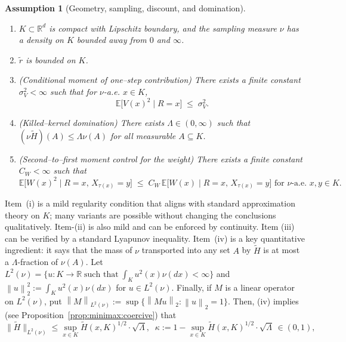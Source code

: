 \documentclass[pdflatex,sn-mathphys-ay]{sn-jnl}%
\numberwithin{equation}{section}
\newcommand\norm[1]{\left\lVert#1\right\rVert}
\newcommand{\R}{\mathbb{R}}
\theoremstyle{thmstyleone}%
\theoremstyle{thmstyletwo}%
\theoremstyle{thmstylethree}%
\newtheorem{assumption}{Assumption}
\begin{document}
\begin{assumption}[Geometry, sampling, discount, and domination]\label{assump:minimax:dom}
\leavevmode
\begin{enumerate}[label=(\roman*)]
\item \(K\subset\mathbb{R}^d\) is compact with Lipschitz boundary, and the sampling measure \(\nu\) has a density on \(K\) bounded away from \(0\) and \(\infty\).
\item \(\tilde{r}\) is bounded on \(K\).
\item (Conditional moment of one–step contribution) There exists a finite constant \(\sigma_V^2<\infty\) such that for \(\nu\)-a.e. \(x\in K\),
\[
\mathbb{E}\big[V(x)^2\mid R=x\big] \;\le\; \sigma_V^2.
\]
\item (Killed–kernel domination) There exists \(\Lambda\in(0,\infty)\) such that $(\nu\tilde{H})(A)\leq\Lambda\nu(A)$ for all measurable $A\subseteq K$.
\item (Second–to–first moment control for the weight) There exists a finite constant \(C_W<\infty\) such that
\[
\mathbb{E}\big[W(x)^2\mid R=x,\,X_{\tau(x)}=y\big] \;\le\; C_W\,\mathbb{E}\big[W(x)\mid R=x,\,X_{\tau(x)}=y\big]
\text{ for \(\nu\text{-a.e. }x,y\in K\).}
\]
\end{enumerate}
\end{assumption}
Item~(i) is a mild regularity condition that aligns with standard approximation theory on \(K\); many variants are possible without changing the conclusions qualitatively. Item-(ii) is also mild and can be enforced by continuity. Item (iii) can be verified by a standard Lyapunov inequality.
Item~(iv) is a key quantitative ingredient: it says that the mass of \(\nu\) transported into any set \(A\) by $\tilde{H}$ is at most a \(\Lambda\)-fraction of \(\nu(A)\).  
Let $L^2(\nu)=\{u:K\rightarrow\R\;\text{such that}\;\int_K u^2(x)\nu(dx)<\infty\}$ and $\norm{u}_2^2:=\int_K u^2(x)\nu(dx)$ for $u\in L^2(\nu)$. Finally, if $M$ is a linear operator on $L^2(\nu)$, put $\norm{M}_{L^2(\nu)}:=\sup\{\norm{Mu}_2:\norm{u}_2=1\}$. Then, (iv) implies (see Proposition~\ref{prop:minimax:coercive}) that
\begin{equation}\label{eq:minimax:kappa}
\|\tilde{H}\|_{L^2(\nu)}\leq \sup_{x\in K}\tilde{H}(x,K)^{1/2}\cdot\sqrt{\Lambda},\;\;
\kappa:=1-\sup_{x\in K}\tilde{H}(x,K)^{1/2}\cdot\sqrt{\Lambda}\,\in (0,1),
\end{equation}
\end{document}
